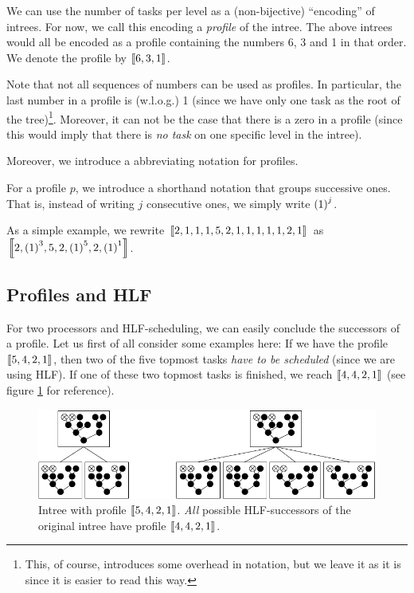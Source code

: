 We can use the number of tasks per level as a (non-bijective) ``encoding'' of intrees. For now, we call this encoding a \emph{profile} of the intree. The above intrees would all be encoded as a profile containing the numbers 6, 3 and 1 in that order. We denote the profile by $\left\llbracket 6, 3, 1 \right\rrbracket$.

Note that not all sequences of numbers can be used as profiles. In particular, the last number in a profile is (w.l.o.g.) 1 (since we have only one task as the root of the tree)\footnote{This, of course, introduces some overhead in notation, but we leave it as it is since it is easier to read this way.}. Moreover, it can not be the case that there is a zero in a profile (since this would imply that there is \emph{no task} on one specific level in the intree).

Moreover, we introduce a abbreviating notation for profiles.

\begin{definition}
  For a profile $p$, we introduce a shorthand notation that groups successive ones. That is, instead of writing $j$ consecutive ones, we simply write ${(1)}^{j}$.
\end{definition}

As a simple example, we rewrite $\left\llbracket 2,1,1,1,5,2,1,1,1,1,1,2,1 \right\rrbracket$ as 
$\left\llbracket 2,{(1)}^{3},5,2,{(1)}^{5},2,{(1)}^{1} \right\rrbracket$.

\subsection{Profiles and HLF}
\label{sec:p2-simple-method-runtime-profiles-hlf}

For two processors and HLF-scheduling, we can easily conclude the successors of a profile. Let us first of all consider some examples here: If we have the profile $\left\llbracket 5,4,2,1 \right\rrbracket$, then two of the five topmost tasks \emph{have to be scheduled} (since we are using HLF). If one of these two topmost tasks is finished, we reach $\left\llbracket 4,4,2,1 \right\rrbracket$ (see figure \ref{fig:p2-profiles-successors-of-5421-always-same} for reference).

\begin{figure}[ht]
  \centering
  \includegraphics{p2/hlf_succs_same_profile.pdf}
  \caption{Intree with profile $\left\llbracket 5,4,2,1 \right\rrbracket$. \emph{All} possible HLF-successors of the original intree have profile $\left\llbracket 4,4,2,1 \right\rrbracket$.}
  \label{fig:p2-profiles-successors-of-5421-always-same}
\end{figure}

